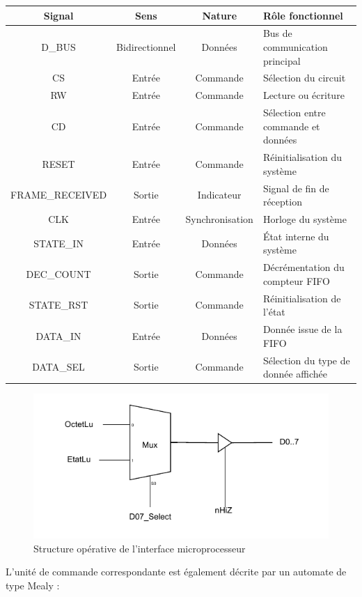 \begin{center}
\renewcommand{\arraystretch}{1.2}
\small
\begin{tabularx}{\textwidth}{|c||c|c|X|}
\hline
\textbf{Signal} & \textbf{Sens} & \textbf{Nature} & \textbf{Rôle fonctionnel} \\ \hline
D\_BUS & Bidirectionnel & Données & Bus de communication principal \\ 
CS & Entrée & Commande & Sélection du circuit \\ 
RW & Entrée & Commande & Lecture ou écriture \\ 
CD & Entrée & Commande & Sélection entre commande et données \\ 
RESET & Entrée & Commande & Réinitialisation du système \\ 
FRAME\_RECEIVED & Sortie & Indicateur & Signal de fin de réception \\ 
CLK & Entrée & Synchronisation & Horloge du système \\ 
STATE\_IN & Entrée & Données & État interne du système \\ 
DEC\_COUNT & Sortie & Commande & Décrémentation du compteur FIFO \\ 
STATE\_RST & Sortie & Commande & Réinitialisation de l’état \\ 
DATA\_IN & Entrée & Données & Donnée issue de la FIFO \\ 
DATA\_SEL & Sortie & Commande & Sélection du type de donnée affichée \\ 
\hline
\end{tabularx}
\end{center}

\begin{figure}[H]
    \centering
    \includegraphics[width=0.8\linewidth]{images/inter/Structure_Interface_Micro.pdf}
    \caption{Structure opérative de l’interface microprocesseur}
    \label{fig:micro_interface}
\end{figure}

L’unité de commande correspondante est également décrite par un automate de type Mealy :

